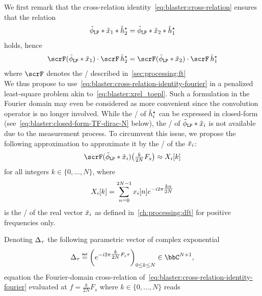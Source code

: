 We first remark that the cross-relation identity~\cref{eq:blaster:cross-relation} ensures that the relation
\begin{equation}
    \idealLowPassFilter
    \ast \contRecordedSignal_1
    \ast  \contFilter_2^\star
    =
    \idealLowPassFilter
    \ast \contRecordedSignal_2
    \ast  \contFilter_1^\star
\end{equation}
holds, hence
\begin{equation}
    \label{eq:blaster:cross-relation-identity-fourier}
    \fourierTrans(\idealLowPassFilter\ast\contRecordedSignal_1) \cdot \fourierTrans \contFilter_2^\star
    =
    \fourierTrans(\idealLowPassFilter\ast\contRecordedSignal_2) \cdot \fourierTrans \contFilter_1^\star
\end{equation}
where $\fourierTrans$ denotes the \FTdef/ described in~\cref{sec:processing:ft}
\\We thus propose to use~\cref{eq:blaster:cross-relation-identity-fourier} in a penalized least-square problem akin to~\cref{eq:blaster:xrel_toepl}.
Such a formulation in the Fourier domain may even be considered as more convenient since the convolution operator is no longer involved.
While the \FT/ of $\tilde{h}_i^\star$ can be expressed in closed-form (see~\cref{eq:blaster:closed-form-TF-dirac-N} below), the \FT/ of $\idealLowPassFilter\ast\contRecordedSignal_i$ is not available due to the measurement process.
To circumvent this issue, we propose the following approximation to approximate it by the \DFTdef/ of the $\tilde{x}_i$:
\begin{equation}
    \label{eq:blaster:approx-TF}
    \fourierTrans(\idealLowPassFilter\ast\contRecordedSignal_i)
    \kparen{\tfrac{k}{2N}F_s}
    \approx
    X_i[k]
\end{equation}
for all integers  $k \in \{0, \ldots, N\}$, where
\begin{equation}
    \label{eq:blaster:dft-Xi}
    X_i[k] = \sum_{n=0}^{2N-1}
    x_i[n]
    {e}^{-{i}2\pi \tfrac{kn}{2N}}
\end{equation}
is the \DFT/ of the real vector $\tilde{x}_i$ as defined in~\cref{ch:processing:dft} for positive frequencies only.

\mynewline
Denoting $\Delta_{\tau}$ the following parametric vector of complex exponential
\begin{equation}
    \label{eq:blaster:closed-form-TF-dirac-N}
    \paramVec{\tau} \eqdef
    \left(\cste^{-\csti2\pi\tfrac{k}{2N}F_s \tau}\right)_{0 \leq k \leq N}
    \in\bbC^{N+1}
    ,
\end{equation}
equation the Fourier-domain cross-relation of~\cref{eq:blaster:cross-relation-identity-fourier} evaluated at $f = \frac{k}{2N}F_s$ where $k \in \{0,\ldots, N\}$
reads

